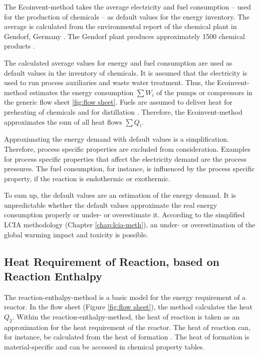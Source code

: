 The Ecoinvent-method takes the average electricity and fuel consumption -- used for the production of chemicals -- as default values for the energy inventory.  The average is calculated from the environmental report of the chemical plant in Gendorf, Germany \cite{GendorfChemiepark.2000}. The Gendorf plant produces approximately 1500 chemical products  \cite{Hischier.2005}.

The calculated average values for energy and fuel consumption are used as default values in the inventory of chemicals. It is assumed that the electricity is used to run process auxiliaries and waste water treatment. Thus, the Ecoinvent-method estimates the energy consumption $\sum W_i$ of the pumps or compressors in the generic flow sheet \ref{fig:flow sheet}. Fuels are assumed to deliver heat for preheating of chemicals and for distillation  \cite{Hischier.2005}. Therefore, the Ecoinvent-method approximates the sum of all heat flows $\sum Q_i$.

Approximating the energy demand with default values is a simplification. Therefore, process specific properties are excluded from consideration. Examples for process specific properties that affect the electricity demand are the process pressures.  The fuel consumption, for instance, is influenced by the process specific property, if the reaction is endothermic or exothermic.

To sum up, the default values are an estimation of the energy demand. It is unpredictable whether the default values approximate the real energy consumption properly or  under- or overestimate it. According to the simplified LCIA methodology (Chapter \ref{chap:lcia-meth}), an under- or overestimation of the global warming impact and toxicity is possible.





\subsection{Heat Requirement of Reaction, based on Reaction Enthalpy}
\label{enthalpy}
The reaction-enthalpy-method is a basic model for the energy requirement of a reactor. In the flow sheet (Figure \ref{fig:flow sheet}), the method calculates the heat $Q_2$. Within the reaction-enthalpy-method, the heat of reaction is taken as an approximation for the heat requirement of the reactor. The heat of reaction can, for instance, be calculated from the heat of formation  \cite{Parvatker.2019}. The heat of formation is material-specific and can be accessed in chemical property tables.

